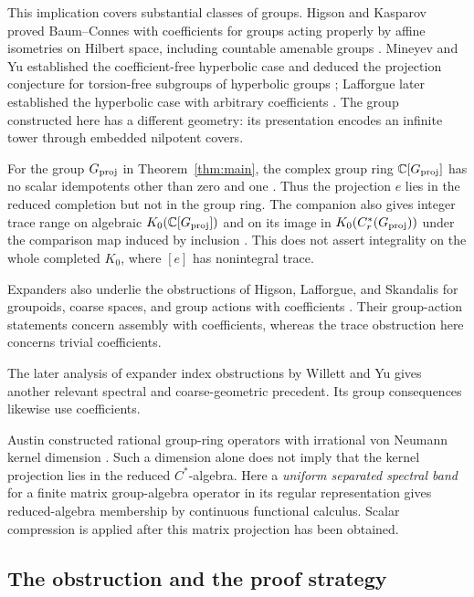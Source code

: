 This implication covers substantial classes of groups. Higson and
Kasparov proved Baum--Connes with coefficients for groups acting properly
by affine isometries on Hilbert space, including countable amenable groups
\cite[Theorem~9.1 and Corollary~9.2]{HK2001}. Mineyev and Yu established
the coefficient-free hyperbolic case and deduced the projection conjecture
for torsion-free subgroups of hyperbolic groups
\cite[Theorems~20--21]{MY2002}; Lafforgue later established the hyperbolic
case with arbitrary coefficients \cite[Theorem~0.4]{Lafforgue2012}.
The group constructed here has a different geometry: its presentation
encodes an infinite tower through embedded nilpotent covers.

For the group \(G_{\mathrm{proj}}\) in Theorem~\ref{thm:main}, the complex group
ring \(\mathbb C[G_{\mathrm{proj}}]\) has no scalar idempotents other than zero and
one \cite[Corollary~1.2(ii)]{OpenAIBass2026}. Thus the projection \(e\)
lies in the reduced completion but not in the group ring. The companion
also gives integer trace range on algebraic \(K_0(\mathbb C[G_{\mathrm{proj}}])\)
and on its image in \(K_0(C_r^*(G_{\mathrm{proj}}))\) under the comparison map
induced by inclusion \cite[Corollary~1.2(i) and Remark~10.1]{OpenAIBass2026}.
This does not assert integrality on the whole completed \(K_0\), where
\([e]\) has nonintegral trace.

Expanders also underlie the obstructions of Higson, Lafforgue,
and Skandalis for groupoids, coarse spaces, and group actions
with coefficients \cite{HLS2002}.
Their group-action statements concern assembly with coefficients,
whereas the trace obstruction here concerns trivial coefficients.

The later analysis of expander index obstructions by Willett and Yu
\cite{WY2012} gives another relevant spectral and coarse-geometric
precedent. Its group consequences likewise use coefficients.

Austin constructed rational group-ring operators with irrational
von Neumann kernel dimension \cite{Austin2013}.
Such a dimension alone does not imply that the kernel projection
lies in the reduced \(C^*\)-algebra.
Here a \emph{uniform separated spectral band} for a finite matrix
group-algebra operator in its regular representation gives
reduced-algebra membership by continuous functional calculus.
Scalar compression is applied after this matrix projection
has been obtained.

\subsection*{The obstruction and the proof strategy}

